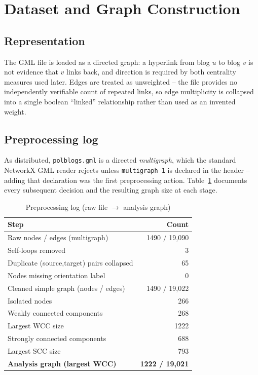\documentclass[10pt,twocolumn]{article}
\begin{document}
\section{Dataset and Graph Construction}
\label{sec:data}

\subsection{Representation}
The GML file is loaded as a directed graph: a hyperlink from blog $u$ to blog $v$ is not evidence
that $v$ links back, and direction is required by both centrality measures used later. Edges are
treated as unweighted -- the file provides no independently verifiable count of repeated links, so
edge multiplicity is collapsed into a single boolean ``linked'' relationship rather than used as an
invented weight.

\subsection{Preprocessing log}
As distributed, \texttt{polblogs.gml} is a directed \emph{multigraph}, which the standard NetworkX
GML reader rejects unless \texttt{multigraph~1} is declared in the header -- adding that declaration
was the first preprocessing action. Table~\ref{tab:preprocess} documents every subsequent decision
and the resulting graph size at each stage.

\begin{table}[h]
\centering
\caption{Preprocessing log (raw file $\rightarrow$ analysis graph)}
\label{tab:preprocess}
\small
\begin{tabular}{@{}lr@{}}
\toprule
Step & Count \\
\midrule
Raw nodes / edges (multigraph) & 1490 / 19{,}090 \\
Self-loops removed & 3 \\
Duplicate (source,target) pairs collapsed & 65 \\
Nodes missing orientation label & 0 \\
Cleaned simple graph (nodes / edges) & 1490 / 19{,}022 \\
Isolated nodes & 266 \\
Weakly connected components & 268 \\
Largest WCC size & 1222 \\
Strongly connected components & 688 \\
Largest SCC size & 793 \\
\textbf{Analysis graph (largest WCC)} & \textbf{1222 / 19{,}021} \\
\bottomrule
\end{tabular}
\end{table}
\end{document}
